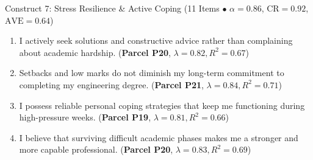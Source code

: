 \documentclass[10pt,a4paper]{article}
\begin{document}
\begin{constructbox}{Construct 7: Stress Resilience \& Active Coping (11 Items $\bullet$ $\alpha = 0.86$, $\text{CR} = 0.92$, $\text{AVE} = 0.64$)}
\begin{enumerate}[label=\textbf{Q\arabic*.}, leftmargin=2.5em, itemsep=2pt, resume]
  \item I actively seek solutions and constructive advice rather than complaining about academic hardship. \hfill (\textbf{Parcel P20}, $\lambda = 0.82, R^2 = 0.67$)
  \item Setbacks and low marks do not diminish my long-term commitment to completing my engineering degree. \hfill (\textbf{Parcel P21}, $\lambda = 0.84, R^2 = 0.71$)
  \item I possess reliable personal coping strategies that keep me functioning during high-pressure weeks. \hfill (\textbf{Parcel P19}, $\lambda = 0.81, R^2 = 0.66$)
  \item I believe that surviving difficult academic phases makes me a stronger and more capable professional. \hfill (\textbf{Parcel P20}, $\lambda = 0.83, R^2 = 0.69$)
\end{enumerate}
\end{constructbox}
\end{document}
